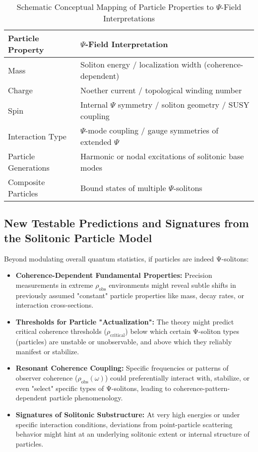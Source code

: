 \documentclass[11pt, a4paper]{book}
\begin{document}
\begin{table}[h!]
\centering
\caption{Schematic Conceptual Mapping of Particle Properties to $\Psi$-Field Interpretations}
\label{tab:particlemapping_mainpaper}
\begin{tabular}{ll}
\hline
\textbf{Particle Property} & \textbf{$\Psi$-Field Interpretation} \\
\hline
Mass & Soliton energy / localization width (coherence-dependent) \\
Charge & Noether current / topological winding number \\
Spin & Internal $\Psi$ symmetry / soliton geometry / SUSY coupling \\
Interaction Type & $\Psi$-mode coupling / gauge symmetries of extended $\Psi$ \\
Particle Generations & Harmonic or nodal excitations of solitonic base modes \\
Composite Particles & Bound states of multiple $\Psi$-solitons \\
\hline
\end{tabular}
\end{table}

\subsection{New Testable Predictions and Signatures from the Solitonic Particle Model}
\label{ssec:particles_newpredictions_mainpaper}
Beyond modulating overall quantum statistics, if particles are indeed Ψ-solitons:
\begin{itemize}
    \item \textbf{Coherence-Dependent Fundamental Properties:} Precision measurements in extreme $\rho_{\text{obs}}$ environments might reveal subtle shifts in previously assumed "constant" particle properties like mass, decay rates, or interaction cross-sections.
    \item \textbf{Thresholds for Particle "Actualization":} The theory might predict critical coherence thresholds ($\rho_{\text{critical}}$) below which certain Ψ-soliton types (particles) are unstable or unobservable, and above which they reliably manifest or stabilize.
    \item \textbf{Resonant Coherence Coupling:} Specific frequencies or patterns of observer coherence ($\rho_{\text{obs}}(\omega)$) could preferentially interact with, stabilize, or even "select" specific types of Ψ-solitons, leading to coherence-pattern-dependent particle phenomenology.
    \item \textbf{Signatures of Solitonic Substructure:} At very high energies or under specific interaction conditions, deviations from point-particle scattering behavior might hint at an underlying solitonic extent or internal structure of particles.
\end{itemize}
\end{document}
